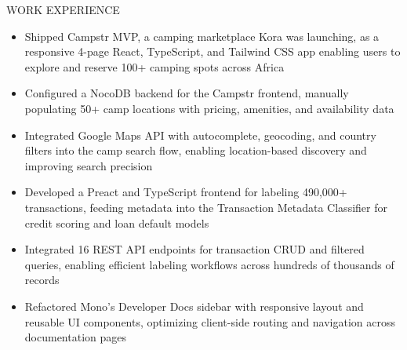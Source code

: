\documentclass{resume}
\begin{document}
\begin{rSection}{WORK EXPERIENCE}
\begin{itemize}
    \itemsep -3pt {}
     \item Shipped Campstr MVP, a camping marketplace Kora was launching, as a responsive 4-page React, TypeScript, and Tailwind CSS app enabling users to explore and reserve 100+ camping spots across Africa
    \item Configured a NocoDB backend for the Campstr frontend, manually populating 50+ camp locations with pricing, amenities, and availability data
    \item Integrated Google Maps API with autocomplete, geocoding, and country filters into the camp search flow, enabling location-based discovery and improving search precision
 \end{itemize}

\begin{itemize}
    \itemsep -3pt {}
     \item Developed a Preact and TypeScript frontend for labeling 490,000+ transactions, feeding metadata into the Transaction Metadata Classifier for credit scoring and loan default models
    \item Integrated 16 REST API endpoints for transaction CRUD and filtered queries, enabling efficient labeling workflows across hundreds of thousands of records
    \item Refactored Mono's Developer Docs sidebar with responsive layout and reusable UI components, optimizing client-side routing and navigation across documentation pages
 \end{itemize}

\end{rSection}
\end{document}
